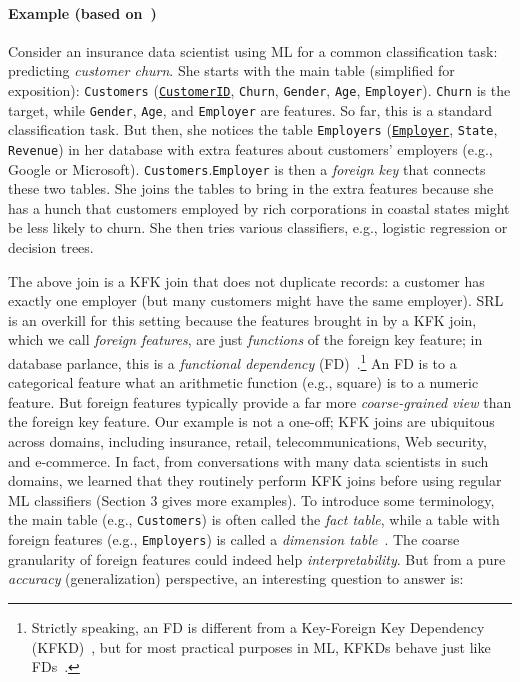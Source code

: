 \documentclass{vldb}
\begin{document}
\paragraph*{Example (based on~\cite{orion})}
Consider an insurance data scientist using ML for a common classification task: predicting \textit{customer churn}. She starts with the main table (simplified 
for exposition): \texttt{Customers} (\underline{\texttt{CustomerID}}, \texttt{Churn}, \texttt{Gender}, \texttt{Age}, \texttt{Employer}). 
\texttt{Churn} is the target, while \texttt{Gender}, \texttt{Age}, and \texttt{Employer} are features. So far, this is a standard classification task.  
But then, she notices the table \texttt{Employers} (\underline{\texttt{Employer}}, \texttt{State}, \texttt{Revenue}) in her database with extra features about 
customers' employers (e.g., Google or Microsoft). \texttt{Customers}.\texttt{Employer} is then a \textit{foreign key} that connects these two tables. 
She joins the tables to bring in the extra features because she has a hunch that customers employed by rich corporations in coastal states might be less likely 
to churn. She then tries various classifiers, e.g., logistic regression or decision trees.

The above join is a KFK join that does not duplicate records: a customer has exactly one employer (but many customers might have the same employer).
SRL is an overkill for this setting because the features brought in by a KFK join, which we call \textit{foreign features}, are just \textit{functions} of 
the foreign key feature; in database parlance, this is a \textit{functional dependency} (FD)~\cite{cowbook}.\footnote{Strictly speaking, an FD is different 
from a Key-Foreign Key Dependency (KFKD)~\cite{dbtheorybook}, but for most practical purposes in ML, KFKDs behave just like FDs~\cite{hamlet}.} 
An FD is to a categorical feature what an arithmetic function (e.g., square) is to a numeric feature. But foreign features typically provide a far more 
\textit{coarse-grained view} than the foreign key feature.
Our example is not a one-off; KFK joins are ubiquitous across domains, including insurance, retail, telecommunications, Web security, 
and e-commerce. In fact, from conversations with many data scientists in such domains, we learned that they routinely perform KFK joins before using 
regular ML classifiers (Section 3 gives more examples). To introduce some terminology, the main table (e.g., \texttt{Customers}) is often called the 
\textit{fact table}, while a table with foreign features (e.g., \texttt{Employers}) is called a \textit{dimension table}~\cite{cowbook}.
%
The coarse granularity of foreign features could indeed help \textit{interpretability}. But from a pure \textit{accuracy} (generalization) perspective, 
an interesting question to answer is: 
\end{document}
